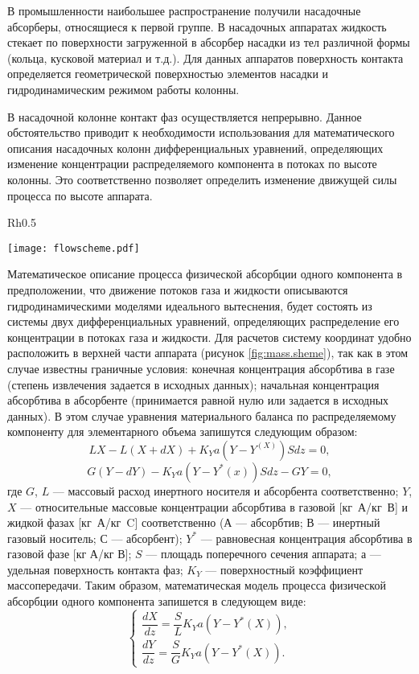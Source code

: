 В промышленности наибольшее распространение получили насадочные абсорберы, относящиеся к первой группе. В насадочных аппаратах жидкость стекает по поверхности загруженной в абсорбер насадки из тел различной формы (кольца, кусковой материал и т.д.). Для данных аппаратов поверхность контакта определяется геометрической поверхностью элементов насадки и гидродинамическим режимом работы колонны.

В насадочной колонне контакт фаз осуществляется непрерывно. Данное обстоятельство приводит к необходимости использования для математического описания насадочных колонн дифференциальных уравнений, определяющих изменение концентрации распределяемого компонента в потоках по высоте колонны. Это соответственно позволяет определить изменение движущей силы процесса по высоте аппарата.
\begin{wrapfigure}{Rh}{0.5\textwidth}
	\begin{center}
		\texttt{[image: flowscheme.pdf]}
	\end{center}
	\caption{ Схема проведения процесса абсорбции (противоточная)} \label{fig:mass.sheme}
\end{wrapfigure}

Математическое описание процесса физической абсорбции одного компонента в предположении, что движение потоков газа и жидкости описываются гидродинамическими моделями идеального вытеснения, будет состоять из системы двух дифференциальных уравнений, определяющих распределение его концентрации в потоках газа и жидкости. Для расчетов систему координат удобно расположить в верхней части аппарата (рисунок \ref{fig:mass.sheme}), так как в этом случае известны граничные условия: конечная концентрация абсорбтива в газе (степень извлечения задается в исходных данных); начальная концентрация абсорбтива в абсорбенте (принимается равной нулю или задается в исходных данных). В этом случае уравнения материального баланса по распределяемому компоненту для элементарного объема  запишутся следующим образом:
\begin{equation}
	L X - L(X +dX) + K_Y a (Y-Y^(X))Sdz=0, 
\end{equation}
\begin{equation}
	G(Y-dY)-K_Y a (Y-Y^*(x))Sdz- GY=0,
\end{equation}
где $G$, $L$ --- массовый расход инертного носителя и абсорбента соответственно; $Y$, $X$ --- относительные массовые концентрации абсорбтива в газовой [кг А/кг В] и жидкой фазах [кг А/кг C] соответственно (А --- абсорбтив; В --- инертный газовый носитель; С --- абсорбент); $Y^*$ --- равновесная концентрация абсорбтива в газовой фазе [кг А/кг В]; $S$ --- площадь поперечного сечения аппарата; $а$ --- удельная поверхность контакта фаз; $K_Y$ --- поверхностный коэффициент массопередачи. Таким образом, математическая модель процесса физической абсорбции одного компонента запишется в следующем виде:
\begin{equation}
\left\lbrace 
\begin{gathered} 
\dfrac{dX}{dz}=\dfrac{S}{L} K_Y a (Y-Y^*(X)),
\\
\dfrac{dY}{dz}=\dfrac{S}{G} K_Y a (Y-Y^*(X)).
\end{gathered} 
\right.
\end{equation}


